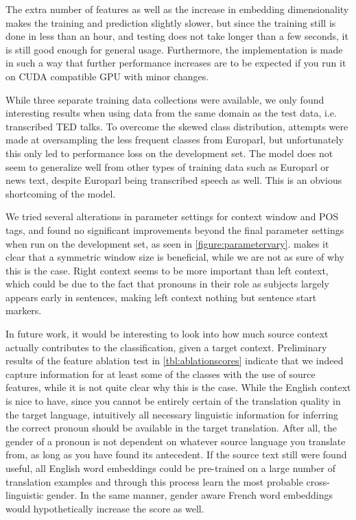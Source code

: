 \documentclass[11pt]{article}
\begin{document}
The extra number of features as well as the increase in embedding dimensionality makes the training and prediction slightly slower, but since the training still is done in less than an hour, and testing does not take longer than a few seconds, it is still good enough for general usage.
Furthermore, the implementation is made in such a way that further performance increases are to be expected if you run it on CUDA compatible GPU with minor changes.

While three separate training data collections were available, we only found interesting results when using data from the same domain as the test data, i.e. transcribed TED talks.
To overcome the skewed class distribution, attempts were made at oversampling the less frequent classes from Europarl, but unfortunately this only led to performance loss on the development set.
The model does not seem to generalize well from other types of training data such as Europarl or news text, despite Europarl being transcribed speech as well.
This is an obvious shortcoming of the model.

We tried several alterations in parameter settings for context window and POS tags, and found no significant improvements beyond the final parameter settings when run on the development set, as seen in \cref{figure:parametervary}.
 makes it clear that a symmetric window size is beneficial, while we are not as sure of why this is the case.
Right context seems to be more important than left context, which could be due to the fact that pronouns in their role as subjects largely appears early in sentences, making left context nothing but sentence start markers.

In future work, it would be interesting to look into how much source context actually contributes to the classification, given a target context.
Preliminary results of the feature ablation test in \cref{tbl:ablationscores} indicate that we indeed capture information for at least some of the classes with the use of source features, while it is not quite clear why this is the case.
While the English context is nice to have, since you cannot be entirely certain of the translation quality in the target language, intuitively all necessary linguistic information for inferring the correct pronoun should be available in the target translation.
After all, the gender of a pronoun is not dependent on whatever source language you translate from, as long as you have found its antecedent.
If the source text still were found useful, all English word embeddings could be pre-trained on a large number of translation examples and through this process learn the most probable cross-linguistic gender.
In the same manner, gender aware French word embeddings would hypothetically increase the score as well.
\end{document}
